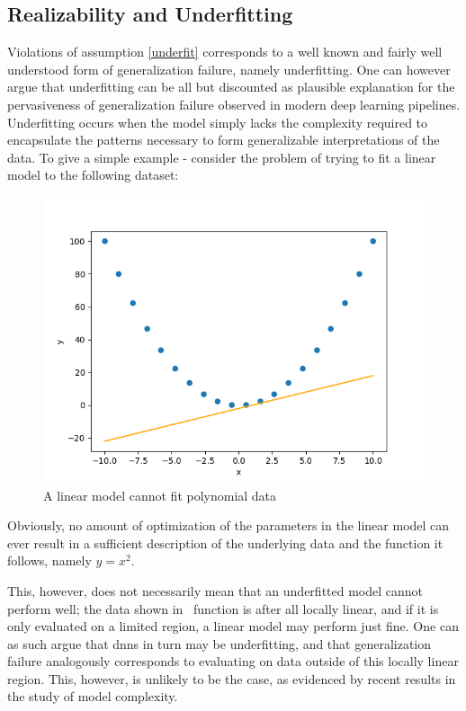 	\subsection{Realizability and Underfitting}
		Violations of assumption \ref{underfit} corresponds to a well known and fairly well understood form of generalization failure, namely underfitting. One can however argue that underfitting can be all but discounted as plausible explanation for the pervasiveness of generalization failure observed in modern deep learning pipelines. Underfitting occurs when the model simply lacks the complexity required to encapsulate the patterns necessary to form generalizable interpretations of the data. To give a simple example - consider the problem of trying to fit a linear model to the following dataset: 
		\begin{figure}[htb]
			\includegraphics[width=\linewidth]{illustrations/regression_example.png}
			\caption[Underfitting]{A linear model cannot fit polynomial data}
			\label{underfit_example}
		\end{figure}
		Obviously, no amount of optimization of the parameters in the linear model can ever result in a sufficient description of the underlying data and the function it follows, namely \(y=x^2\). 
		
		This, however, does not necessarily mean that an underfitted model cannot perform well; the data shown in~ function is after all locally linear, and if it is only evaluated on a limited region, a linear model may perform just fine. One can as such argue that \glspl{dnn} in turn may be underfitting, and that generalization failure analogously corresponds to evaluating on data outside of this locally linear region. This, however, is unlikely to be the case, as evidenced by recent results in the study of model complexity.
		
